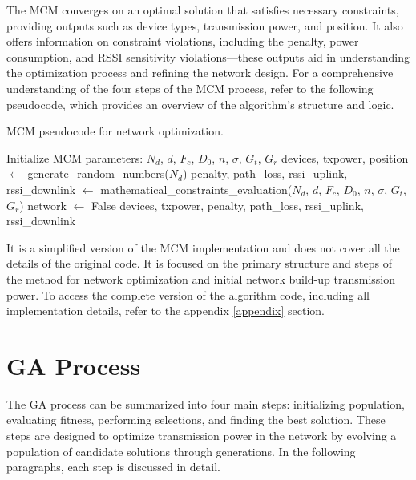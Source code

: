 The \gls{MCM} converges on an optimal solution that satisfies necessary constraints, providing outputs such as device types, transmission power, and position. It also offers information on constraint violations, including the penalty, power consumption, and \gls{RSSI} sensitivity violations—these outputs aid in understanding the optimization process and refining the network design. For a comprehensive understanding of the four steps of the \gls{MCM} process, refer to the following pseudocode, which provides an overview of the algorithm's structure and logic.

\begin{algorithm}[H]
    \caption{\gls{MCM} pseudocode for network optimization.}
    \label{alg:mcm}
    \begin{algorithmic}
    \STATE Initialize \gls{MCM} parameters: $N_d$, $d$, $F_c$, $D_0$, $n$, $\sigma$, $G_t$, $G_r$
        \STATE devices, txpower, position $\gets$ generate\_random\_numbers($N_d$)
        \STATE penalty, path\_loss, rssi\_uplink, rssi\_downlink $\gets$ mathematical\_constraints\_evaluation($N_d$, $d$, $F_c$, $D_0$, $n$, $\sigma$, $G_t$, $G_r$)
            \STATE network $\gets$ False
        \ENDIF
        \RETURN devices, txpower, penalty, path\_loss, rssi\_uplink, rssi\_downlink
    \ENDWHILE
    \end{algorithmic}
\end{algorithm}

It is a simplified version of the \gls{MCM} implementation and does not cover all the details of the original code. It is focused on the primary structure and steps of the method for network optimization and initial network build-up transmission power. To access the complete version of the algorithm code, including all implementation details, refer to the appendix \ref{appendix} section.

\section{\texorpdfstring{\acrlong{GA}}{GA} Process}\label{sec:genetic_algorithm}

The \gls{GA} process can be summarized into four main steps: initializing population, evaluating fitness, performing selections, and finding the best solution. These steps are designed to optimize transmission power in the network by evolving a population of candidate solutions through generations. In the following paragraphs, each step is discussed in detail.

